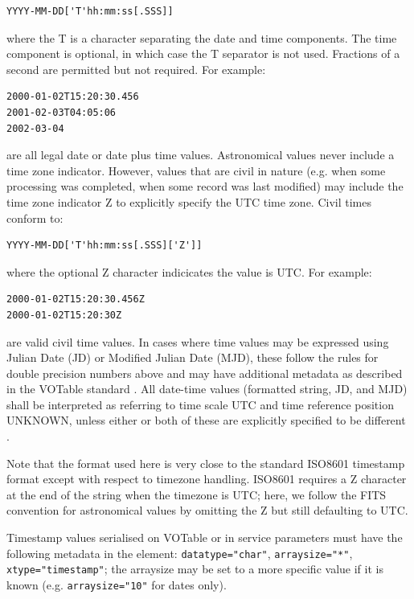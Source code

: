 \documentclass[11pt,letter]{ivoa}
\begin{document}
\begin{verbatim}
YYYY-MM-DD['T'hh:mm:ss[.SSS]]
\end{verbatim}

where the  T is a character separating the date and time components. The time 
component is optional, in which case the T separator is not used. Fractions of a 
second are permitted but not required. For example:

\begin{verbatim}
2000-01-02T15:20:30.456
2001-02-03T04:05:06
2002-03-04
\end{verbatim}

are all legal date or date plus time values. Astronomical values never 
include a time zone indicator. However, values that 
are civil in nature (e.g. when some processing was completed, when some record 
was last modified) may include the time zone indicator Z to explicitly specify 
the UTC time zone. Civil times conform to:

\begin{verbatim}
YYYY-MM-DD['T'hh:mm:ss[.SSS]['Z']]
\end{verbatim}

where the optional Z character indicicates the value is UTC. For example:

\begin{verbatim}
2000-01-02T15:20:30.456Z
2000-01-02T15:20:30Z
\end{verbatim}

are valid civil time values. In cases where time values may be 
expressed using Julian Date (JD) or Modified Julian Date (MJD), these follow the 
rules for double precision numbers above and may have additional metadata as 
described in the VOTable standard \citep{std:VOTABLE}. All date-time values (formatted string, JD, 
and MJD) shall be interpreted as referring to time scale UTC and time reference 
position UNKNOWN, unless either or both of these are explicitly specified to be 
different \citep{std:STC}. 

Note that the format used here is very close to the standard ISO8601 timestamp 
format except with respect to timezone handling. ISO8601 requires a Z character 
at the end of the string when the timezone is UTC; here, we follow the FITS 
\citep{std:FITS} convention for astronomical values by omitting the Z but still 
defaulting to UTC.

Timestamp values serialised on VOTable or in service parameters must have the following metadata in 
the  element: \verb|datatype="char"|,  \verb|arraysize="*"|,
\verb|xtype="timestamp"|; the arraysize may be set to a more specific value if it is known (e.g. 
\verb|arraysize="10"| for dates only).
 
\end{document}
